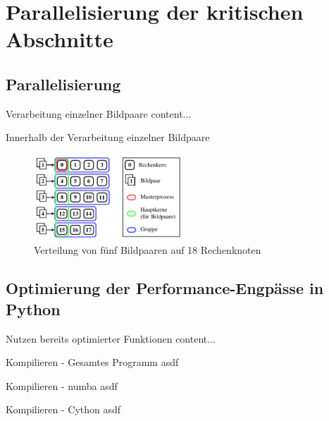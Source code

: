 \section{Parallelisierung der kritischen Abschnitte}

\subsection{Parallelisierung}
\begin{frame}{Verarbeitung einzelner Bildpaare}
	content...
\end{frame}

\begin{frame}{Innerhalb der Verarbeitung einzelner Bildpaare}
	\begin{figure}[h]
		\centering
		\includegraphics[width=0.5\textwidth]{pdf/parallel}
		\caption[Verteilung]{Verteilung von fünf Bildpaaren auf 18 Rechenknoten}
	\end{figure}
\end{frame}

\subsection{Optimierung der Performance-Engpässe in Python}
\begin{frame}[allowframebreaks]{Nutzen bereits optimierter Funktionen}
	content...
\end{frame}

\begin{frame}[allowframebreaks]{Kompilieren - Gesamtes Programm}
	asdf
\end{frame}

\begin{frame}[allowframebreaks]{Kompilieren - numba}
	asdf
\end{frame}

\begin{frame}[allowframebreaks]{Kompilieren - Cython}
	asdf
\end{frame}